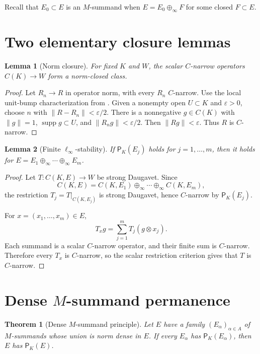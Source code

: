 \documentclass[11pt]{article}
\newtheorem{theorem}{Theorem}
\newtheorem{lemma}{Lemma}
\newcommand{\supp}{\operatorname{supp}}
\begin{document}
Recall that \(E_0\subset E\) is an \(M\)-summand when
\(E=E_0\oplus_\infty F\) for some closed \(F\subset E\).

\section*{Two elementary closure lemmas}

\begin{lemma}[Norm closure]
\label{lem:closed}
For fixed \(K\) and \(W\), the scalar \(C\)-narrow operators
\(C(K)\to W\) form a norm-closed class.
\end{lemma}

\begin{proof}
Let \(R_n\to R\) in operator norm, with every \(R_n\) \(C\)-narrow.  Use the
local unit-bump characterization from \cite{BKSSW}.  Given a nonempty open
\(U\subset K\) and \(\varepsilon>0\), choose \(n\) with
\(\|R-R_n\|<\varepsilon/2\).  There is a nonnegative \(g\in C(K)\) with
\(\|g\|=1\), \(\supp g\subset U\), and
\(\|R_ng\|<\varepsilon/2\).  Then
\(\|Rg\|<\varepsilon\).  Thus \(R\) is \(C\)-narrow.
\end{proof}

\begin{lemma}[Finite \(\ell_\infty\)-stability]
\label{lem:finite}
If \(\mathsf P_K(E_j)\) holds for \(j=1,\dots,m\), then it holds for
\(E=E_1\oplus_\infty\cdots\oplus_\infty E_m\).
\end{lemma}

\begin{proof}
Let \(T:C(K,E)\to W\) be strong Daugavet.  Since
\[
 C(K,E)=C(K,E_1)\oplus_\infty\cdots\oplus_\infty C(K,E_m),
\]
the restriction \(T_j=T|_{C(K,E_j)}\) is strong Daugavet, hence
\(C\)-narrow by \(\mathsf P_K(E_j)\).

For \(x=(x_1,\dots,x_m)\in E\),
\[
 T_xg=\sum_{j=1}^m T_j(g\otimes x_j).
\]
Each summand is a scalar \(C\)-narrow operator, and their finite sum is
\(C\)-narrow.  Therefore every \(T_x\) is \(C\)-narrow, so the scalar
restriction criterion gives that \(T\) is \(C\)-narrow.
\end{proof}

\section*{Dense \(M\)-summand permanence}

\begin{theorem}[Dense \(M\)-summand principle]
\label{thm:skeleton}
Let \(E\) have a family \((E_\alpha)_{\alpha\in A}\) of \(M\)-summands whose
union is norm dense in \(E\).  If every \(E_\alpha\) has
\(\mathsf P_K(E_\alpha)\), then \(E\) has \(\mathsf P_K(E)\).
\end{theorem}
\end{document}

